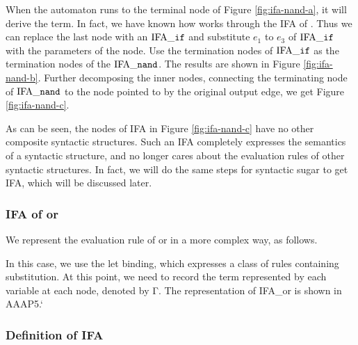 When the automaton runs to the terminal node of Figure \ref{fig:ifa-nand-a}, it will derive the  term. In fact, we have known how  works through the IFA of . Thus we can replace the last node with an $\text{IFA}\_\mbox{\tt if}$ and substitute $e_1$ to $e_3$ of $\text{IFA}\_\mbox{\tt if}$ with the parameters of the node. Use the termination nodes of $\text{IFA}\_\mbox{\tt if}$ as the termination nodes of the $\text{IFA}\_\mbox{\tt nand}$. The results are shown in Figure \ref{fig:ifa-nand-b}. Further decomposing the inner nodes, connecting the terminating node of $\text{IFA}\_\mbox{\tt nand}$ to the node pointed to by the original output edge, we get Figure \ref{fig:ifa-nand-c}.

As can be seen, the nodes of IFA in Figure \ref{fig:ifa-nand-c} have no other composite syntactic structures. Such an IFA completely expresses the semantics of a syntactic structure, and no longer cares about the evaluation rules of other syntactic structures. In fact, we will do the same steps for syntactic sugar to get IFA, which will be discussed later.

\subsubsection{IFA of or}

We represent the evaluation rule of or in a more complex way, as follows.

In this case, we use the let binding, which expresses a class of rules containing substitution. At this point, we need to record the term represented by each variable at each node, denoted by Γ. The representation of IFA\_or is shown in AAAP5.`

\subsubsection{Definition of IFA}


